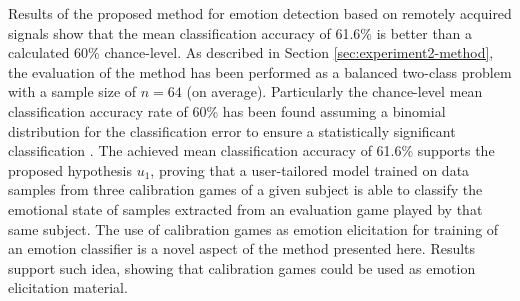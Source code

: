 Results of the proposed method for emotion detection based on remotely acquired signals show that the mean classification accuracy of 61.6\% is better than a calculated 60\% chance-level. As described in Section \ref{sec:experiment2-method}, the evaluation of the method has been performed as a balanced two-class problem with a sample size of $n=64$ (on average). Particularly the chance-level mean classification accuracy rate of 60\% has been found assuming a binomial distribution for the classification error to ensure a statistically significant classification \parencite{combrisson2015exceeding}. The achieved mean classification accuracy of 61.6\% supports the proposed hypothesis $u_1$, proving that a user-tailored model trained on data samples from three calibration games of a given subject is able to classify the emotional state of samples extracted from an evaluation game played by that same subject. The use of calibration games as emotion elicitation for training of an emotion classifier is a novel aspect of the method presented here. Results support such idea, showing that calibration games could be used as emotion elicitation material.

